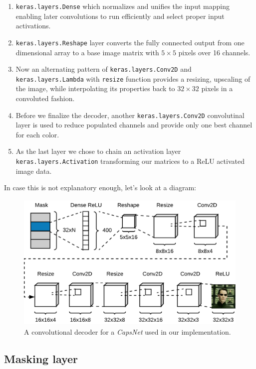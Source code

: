 \begin{enumerate}
    \item \texttt{keras.layers.Dense} which normalizes and unifies the input mapping enabling later convolutions to run efficiently and select proper input activations.
    \item \texttt{keras.layers.Reshape} layer converts the fully connected output from one dimensional array to a base image matrix with $5\times5$ pixels over 16 channels.
    \item Now an alternating pattern of \texttt{keras.layers.Conv2D} and \texttt{keras.layers.Lambda} with \texttt{resize} function provides a resizing, upscaling of the image, while interpolating its properties back to $32\times32$ pixels in a convoluted fashion.
    \item Before we finalize the decoder, another \texttt{keras.layers.Conv2D} convolutinal layer is used to reduce populated channels and provide only one best channel for each color.
    \item As the last layer we chose to chain an activation layer \texttt{keras.layers.Activation} transforming our matrices to a ReLU activated image data.
\end{enumerate}

In case this is not explanatory enough, let's look at a diagram:

\begin{figure}[ht]
    \centering
    \includegraphics[height=18em]{obrazky-figures/my_decoder.pdf}
    \caption{A convolutional decoder for a \textit{CapsNet} used in our implementation.}
    \label{fig:decoder}
\end{figure}

\subsection{Masking layer}

